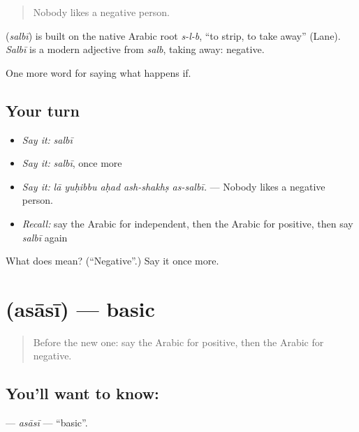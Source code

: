 \begin{quote}
Nobody likes a negative person.
\end{quote}

\begin{cousinweb}
\textbf{} (\emph{salbī}) is built on the native Arabic root \emph{s-l-b}, \textquotedblleft{}to strip, to take away\textquotedblright{} (Lane). \emph{Salbī} is a modern adjective from \emph{salb}, taking away: negative.
\end{cousinweb}

\begin{grammarlens}[title={What you've built}]
One more word for saying what happens if.
\end{grammarlens}

\subsection*{Your turn}
\begin{itemize}
\raggedright
  \item \emph{Say it:} \emph{salbī}
  \item \emph{Say it:} \emph{salbī}, once more
  \item \emph{Say it:} \emph{lā yuḥibbu aḥad ash-shakhṣ as-salbī.} — Nobody likes a negative person.
  \item \emph{Recall:} say the Arabic for independent, then the Arabic for positive, then say \emph{salbī} again
\end{itemize}

\begin{tcolorbox}[breakable,colback=teal!4,colframe=teal!35!black,title={Before you move on}]
What does  mean? (\textquotedblleft{}Negative\textquotedblright{}.) Say it once more.
\end{tcolorbox}
\section[\texorpdfstring{\ar{أساسي} (asāsī)}{أساسي (asāsī)}]{ (asāsī) — basic}

\label{lesson:AR-C419-asasi}



\begin{quote}
Before the new one: say the Arabic for positive, then the Arabic for negative.
\end{quote}

\subsection*{You'll want to know: }
\textbf{} — \emph{asāsī} — \textquotedblleft{}basic\textquotedblright{}.

